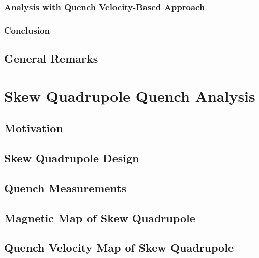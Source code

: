 \documentclass[11pt,a4paper]{report}
\begin{document}
\subsection{Analysis with Quench Velocity-Based Approach}
\label{section:quench_velocity_benchmarking_with_insulation_quench_velocity}


\subsection{Conclusion}


\section{General Remarks}


\clearpage
\chapter{Skew Quadrupole Quench Analysis}
\label{chapter:skew_quadrupole_quench_detection_analysis}

\section{Motivation}


\section{Skew Quadrupole Design}


\section{Quench Measurements}
\label{section:quench_measurements}


\section{Magnetic Map of Skew Quadrupole}
\label{section: magnetic_map_skew_quad}


\section{Quench Velocity Map of Skew Quadrupole}

\end{document}

